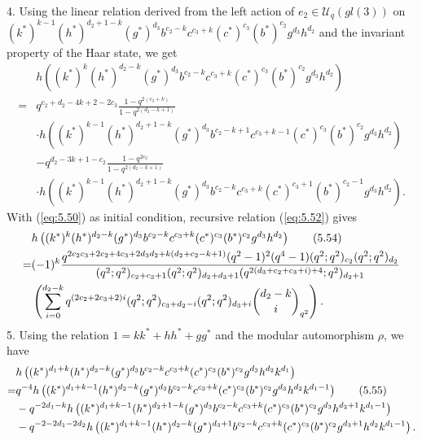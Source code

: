 \documentclass[table,a4paper,reqno]{amsart}
\numberwithin{equation}{section}
\theoremstyle{definition}
\begin{document}
4. Using the linear relation derived from the left action of $e_2\in\mathcal{U}_q(gl(3))$ on $(k^*)^{k-1}(h^*)^{d_2+1-k}(g^*)^{d_3}b^{c_2-k}c^{c_3+k}(c^*)^{c_3}(b^*)^{c_2}g^{d_3}h^{d_2}$ and the invariant property of the Haar state, we get
\begin{equation}\label{eq:5.52}
    \begin{split}
        &h\left((k^*)^{k}(h^*)^{d_2-k}(g^*)^{d_3}b^{c_2-k}c^{c_3+k}(c^*)^{c_3}(b^*)^{c_2}g^{d_3}h^{d_2}\right)\\
        =&q^{c_2+d_2-4k+2-2c_3}\frac{1-q^{2(c_3+k)}}{1-q^{2(d_2-k+1)}}\\
        &\cdot h\left((k^*)^{k-1}(h^*)^{d_2+1-k}(g^*)^{d_3}b^{c_2-k+1}c^{c_3+k-1}(c^*)^{c_3}(b^*)^{c_2}g^{d_3}h^{d_2}\right)\\
        &-q^{d_2-3k+1-c_2}\frac{1-q^{2c_2}}{1-q^{2(d_2-k+1)}}\\
        &\cdot h\left((k^*)^{k-1}(h^*)^{d_2+1-k}(g^*)^{d_3}b^{c_2-k}c^{c_3+k}(c^*)^{c_3+1}(b^*)^{c_2-1}g^{d_3}h^{d_2}\right).
    \end{split}
\end{equation}
With (\ref{eq:5.50}) as initial condition, recursive relation (\ref{eq:5.52}) gives
\begin{align}\label{eq:5.53}\stepcounter{equation}
        &h\left((k^*)^{k}(h^*)^{d_2-k}(g^*)^{d_3}b^{c_2-k}c^{c_3+k}(c^*)^{c_3}(b^*)^{c_2}g^{d_3}h^{d_2}\right)\tag{5.54}\\
        =&(-1)^k\frac{q^{2c_2c_3+2c_2+4c_3+2d_3d_2+k(d_2+c_2-k+1)}(q^2-1)^2(q^4-1)(q^2;q^2)_{c_2}(q^2;q^2)_{d_2}}{(q^2;q^2)_{c_2+c_3+1}(q^2;q^2)_{d_2+d_3+1}(q^{2(d_3+c_2+c_3+i)+4};q^2)_{d_2+1}}\notag\\
        &\left(\sum_{i=0}^{d_2-k}q^{(2c_2+2c_3+2)i}(q^2;q^2)_{c_3+d_2-i}(q^2;q^2)_{d_3+i}{d_2-k\choose i}_{q^2}\right).\notag
\end{align}
5. Using the relation $1=kk^*+hh^*+gg^*$ and the modular automorphism $\rho$, we have
\begin{align}\label{eq:5.54}\stepcounter{equation}
        &h\left((k^*)^{d_1+k}(h^*)^{d_2-k}(g^*)^{d_3}b^{c_2-k}c^{c_3+k}(c^*)^{c_3}(b^*)^{c_2}g^{d_3}h^{d_2}k^{d_1}\right)\notag\\
        =&q^{-4}h\left((k^*)^{d_1+k-1}(h^*)^{d_2-k}(g^*)^{d_3}b^{c_2-k}c^{c_3+k}(c^*)^{c_3}(b^*)^{c_2}g^{d_3}h^{d_2}k^{d_1-1}\right)\tag{5.55}\\
        &-q^{-2d_1-k}h\left((k^*)^{d_1+k-1}(h^*)^{d_2+1-k}(g^*)^{d_3}b^{c_2-k}c^{c_3+k}(c^*)^{c_3}(b^*)^{c_2}g^{d_3}h^{d_2+1}k^{d_1-1}\right)\notag\\
        &-q^{-2-2d_1-2d_2}h\left((k^*)^{d_1+k-1}(h^*)^{d_2-k}(g^*)^{d_3+1}b^{c_2-k}c^{c_3+k}(c^*)^{c_3}(b^*)^{c_2}g^{d_3+1}h^{d_2}k^{d_1-1}\right).\notag
\end{align}
\end{document}
